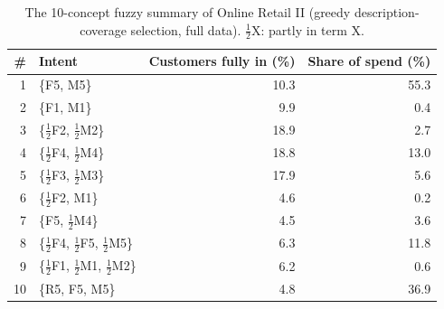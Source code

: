 \begin{table}[t]
\centering\small
\caption{The 10-concept fuzzy summary of Online Retail II (greedy description-coverage selection, full data). $\tfrac12$X: partly in term X.}
\label{tab:summaryview}
\begin{tabular}{rlrr}
\toprule
\# & Intent & Customers fully in (\%) & Share of spend (\%) \\
\midrule
1 & \{F5, M5\} & 10.3 & 55.3 \\
2 & \{F1, M1\} & 9.9 & 0.4 \\
3 & \{$\tfrac12$F2, $\tfrac12$M2\} & 18.9 & 2.7 \\
4 & \{$\tfrac12$F4, $\tfrac12$M4\} & 18.8 & 13.0 \\
5 & \{$\tfrac12$F3, $\tfrac12$M3\} & 17.9 & 5.6 \\
6 & \{$\tfrac12$F2, M1\} & 4.6 & 0.2 \\
7 & \{F5, $\tfrac12$M4\} & 4.5 & 3.6 \\
8 & \{$\tfrac12$F4, $\tfrac12$F5, $\tfrac12$M5\} & 6.3 & 11.8 \\
9 & \{$\tfrac12$F1, $\tfrac12$M1, $\tfrac12$M2\} & 6.2 & 0.6 \\
10 & \{R5, F5, M5\} & 4.8 & 36.9 \\
\bottomrule
\end{tabular}
\end{table}
